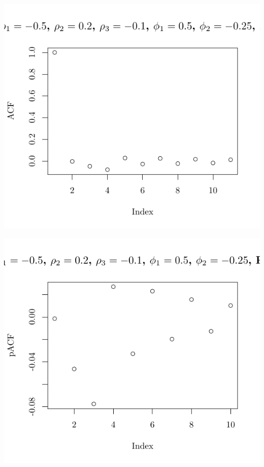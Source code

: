 \documentclass[10pt]{paper}\usepackage[]{graphicx}\usepackage[]{color}
\makeatletter
\def\maxwidth{ %
  \ifdim\Gin@nat@width>\linewidth
    \linewidth
  \else
    \Gin@nat@width
  \fi
}
\newenvironment{knitrout}{}{} %
\makeatother
\begin{document}
\begin{knitrout}
{\centering \includegraphics[width=\maxwidth]{figure/graphics-plotter-165} 

}




{\centering \includegraphics[width=\maxwidth]{figure/graphics-plotter-166} 

}





\end{knitrout}
\end{document}
